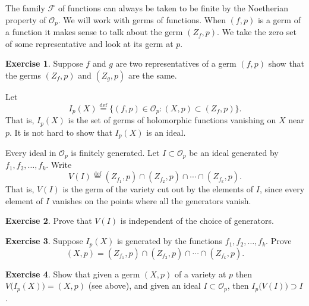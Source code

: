 \documentclass[12pt,openany]{book}
\newcommand{\sF}{{\mathscr{F}}}
\newcommand{\sO}{{\mathscr{O}}}
\theoremstyle{plain}
\theoremstyle{remark}
\theoremstyle{definition}
\newenvironment{exbox}{%
    \def\FrameCommand{\vrule width 1pt \relax\hspace {10pt}}%
    \MakeFramed {\advance \hsize -\width \FrameRestore }%
}{%
    \endMakeFramed
}
\theoremstyle{exercise}
\newtheorem{exercise}{Exercise}[section]
\theoremstyle{example}
\begin{document}
The family $\sF$ of functions can always be taken to be finite by the
Noetherian property of $\sO_p$.
We will work with germs of functions.  When $(f,p)$ is a germ of a function
it makes sense to talk about the germ $(Z_f,p)$.  We take the zero
set of some representative and look at its germ at $p$.

\begin{exbox}
\begin{exercise}
Suppose $f$ and $g$ are two representatives of a germ $(f,p)$
show that the germs $(Z_f,p)$ and $(Z_g,p)$ are the same.
\end{exercise}
\end{exbox}

Let
%
\begin{equation*}
I_p(X) \overset{\text{def}}{=}
\bigl\{ (f,p) \in \sO_p : (X,p) \subset (Z_f,p) \bigr\} .
\end{equation*}
That is, $I_p(X)$ is the set of germs of holomorphic functions vanishing on
$X$ near $p$.  It is not hard to show that $I_p(X)$ is an ideal.

Every ideal in $\sO_p$ is finitely generated.
Let $I \subset \sO_p$ be an ideal generated by $f_1,f_2,\ldots,f_k$.
Write
%
\begin{equation*}
V(I) \overset{\text{def}}{=}
(Z_{f_1},p) \cap (Z_{f_2},p) \cap \cdots \cap (Z_{f_k},p) .
\end{equation*}
That is, $V(I)$ is the germ of the variety cut out by the elements of $I$,
since every
element of $I$ vanishes on the points where all the generators vanish.

\begin{exbox}
\begin{exercise}
Prove that $V(I)$ is independent of the choice of generators.
\end{exercise}

\begin{exercise}
Suppose $I_p(X)$ is generated by the functions $f_1, f_2, \ldots, f_k$.
Prove 
\begin{equation*}
(X,p) = (Z_{f_1},p) \cap (Z_{f_2},p) \cap \cdots \cap (Z_{f_k},p) .
\end{equation*}
\end{exercise}

\begin{exercise}
Show that given a germ $(X,p)$ of a variety at $p$ then
$V\bigl(I_p(X)\bigr) = (X,p)$ (see above), and
given an ideal $I \subset \sO_p$, then
$I_p\bigl(V(I)\bigr) \supset I$.
\end{exercise}
\end{exbox}
\end{document}
